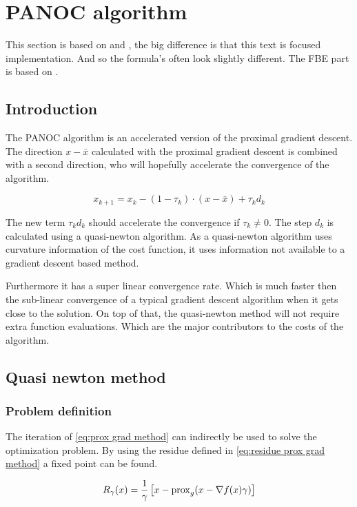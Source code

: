 \section{PANOC algorithm}
	This section is based on \cite{LorenzoStella2017} and \cite{AjaySathya2017}, the big difference is that this text is focused implementation. And so the formula's often look slightly different. The FBE part is based on \cite{Themelis}.
	\subsection{Introduction}
		The PANOC algorithm is an accelerated version of the proximal gradient descent. The direction  $x-\bar{x}$ calculated with the proximal gradient descent  is combined with a second direction, who will hopefully accelerate the convergence of the algorithm.
		
		\begin{equation}
		x_{k+1} = x_k - (1-\tau_k)\cdot (x-\bar{x}) + \tau_k d_k
		\end{equation}
		
		The new term $\tau_kd_k$ should accelerate the convergence if $\tau_k\neq0$. The step $d_k$ is calculated using a quasi-newton algorithm. As a quasi-newton algorithm uses curvature information of the cost function, it uses information not available to a gradient descent based method. 
		
		Furthermore it has a super linear convergence rate. Which is much faster then the sub-linear convergence of a typical gradient descent algorithm when it gets close to the solution. On top of that, the quasi-newton method will not require extra function evaluations. Which are the major contributors to the costs of the algorithm.
		
	\subsection{Quasi newton method}
		\subsubsection{Problem definition}
			The iteration of \eqref{eq:prox grad method} can indirectly be used to solve the optimization problem.  By using the residue defined in \eqref{eq:residue prox grad method} a fixed point can be found. 
			
			\begin{equation}
			R_{\gamma}(x)= \frac{1}{\gamma}\left[ x - \operatorname{prox}_g( x - \nabla f(x)\gamma) \right]
			\label{eq:residue prox grad method}
			\end{equation}
			
